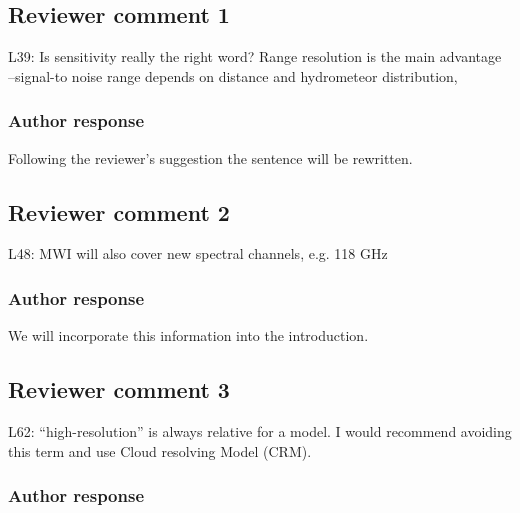 \documentclass[11pt]{scrartcl}
\begin{document}
\subsection*{Reviewer comment 1}

L39: Is sensitivity really the right word? Range resolution is the main
advantage –signal-to noise range depends on distance and hydrometeor
distribution,

\subsubsection*{Author response}

Following the reviewer's suggestion the sentence will be rewritten.


\subsection*{Reviewer comment 2}

L48: MWI will also cover new spectral channels, e.g. 118 GHz

\subsubsection*{Author response}

We will incorporate this information into the introduction.

%

\subsection*{Reviewer comment 3}

L62: “high-resolution” is always relative for a model. I would recommend avoiding this term and use Cloud resolving Model (CRM).

\subsubsection*{Author response}
\end{document}
